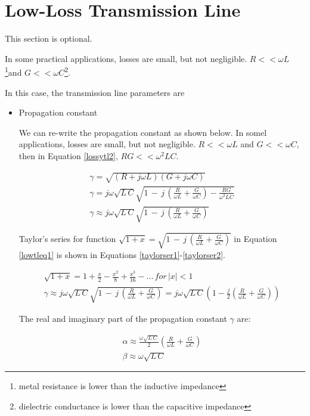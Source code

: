 \documentclass{ximera}
\begin{document}
\section{Low-Loss Transmission Line}

This section is optional.


In some practical applications, losses are small, but not negligible.  $R<< \omega L$ \footnote{metal resistance is
lower than the inductive impedance}and $G <<  \omega C$\footnote{dielectric conductance is lower than the capacitive impedance}. 

In this case, the transmission line parameters are
\begin{itemize}
\item Propagation constant

We can re-write the propagation constant as shown below. 
In somel applications,  losses are small, but not negligible.  $R<< \omega L$ and $G <<  \omega C$, then
in Equation \ref{lossytl2}, $ RG<< \omega^2 LC$.

\begin{eqnarray}
\gamma =\sqrt{(R+j\omega L)(G+ j\omega C)}   \\ 
\gamma= j\omega \sqrt{ L\, C}\sqrt{1\,-\,j\,\left( \frac{R}{\omega L}+\frac{G}{\omega C} \right)-\frac{R G}{\omega^2  L  C}} \label{lossytl2} \\ 
\gamma\approx j\omega \sqrt{ L\, C}\sqrt{1\,-\,j\,\left( \frac{R}{\omega L}+\frac{G}{\omega C} \right)}\label{lowtleq1}
\end{eqnarray}

Taylor's series for function $\sqrt{1+x}= \sqrt{1\,-\,j\,\left( \frac{R}{\omega L}+\frac{G}{\omega C} \right)}$ in Equation \ref{lowtleq1} is shown in Equations \ref{taylorser1}-\ref{taylorser2}.

\begin{eqnarray}
\sqrt{1+x}=1+\frac{x}{2}-\frac{x^2}{8}+\frac{x^3}{16}-...  \,for\, |x|<1 \label{taylorser1} \\
\gamma \approx  j\omega \sqrt{ L\, C} \sqrt{1\,-\,j\,\left( \frac{R}{\omega L}+\frac{G}{\omega C} \right)}= j\omega \sqrt{ L\, C}\left(1-\frac{j}{2} \left(  \frac{R}{\omega L}+\frac{G}{\omega C} \right)\right) \label{taylorser2}
\end{eqnarray}


The real and imaginary part of the propagation constant  $\gamma$ are:

\begin{eqnarray}
\alpha\approx  \frac{   \omega \sqrt{ L\, C}  }{2} \left(  \frac{R}{\omega L}+\frac{G}{\omega C} \right)  \\
\beta\approx     \omega \sqrt{ L\, C}
\end{eqnarray}



\end{itemize}
\end{document}
